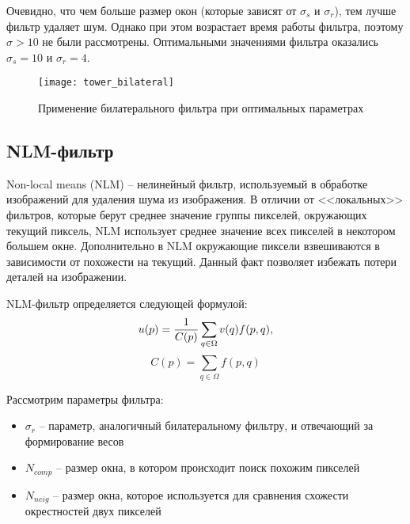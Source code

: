 Очевидно, что чем больше размер окон (которые зависят от $\sigma_s$ и $\sigma_r$), тем лучше фильтр удаляет шум. Однако при этом возрастает время работы фильтра, поэтому $\sigma > 10$ не были рассмотрены. Оптимальными значениями фильтра оказались $\sigma_s = 10$ и $\sigma_r = 4$.

\begin{figure}[H]
	\centering
	\texttt{[image: tower\_bilateral]}
	\caption{Применение билатерального фильтра при оптимальных параметрах}
\end{figure}

\subsection{NLM-фильтр}

Non-local means (NLM) -- нелинейный фильтр, используемый в обработке изображений для удаления шума из изображения. В отличии от <<локальных>> фильтров, которые берут среднее значение группы пикселей, окружающих текущий пиксель, NLM использует среднее значение всех пикселей в некотором большем окне. Дополнительно в NLM окружающие пиксели взвешиваются в зависимости от похожести на текущий. Данный факт позволяет избежать потери деталей на изображении.

NLM-фильтр определяется следующей формулой:
$$
u(p)={1 \over C(p)}\sum _{{q\in \Omega }}v(q)f(p,q),
$$
$$
C(p)=\sum _{{q\in \Omega }}f(p,q)
$$

Рассмотрим параметры фильтра:
\begin{itemize}
	\item $\sigma_r$ -- параметр, аналогичный билатеральному фильтру, и отвечающий за формирование весов
	\item $N_{comp}$ -- размер окна, в котором происходит поиск похожим пикселей
	\item $N_{neig}$ -- размер окна, которое используется для сравнения схожести окрестностей двух пикселей
\end{itemize}

\newpage

